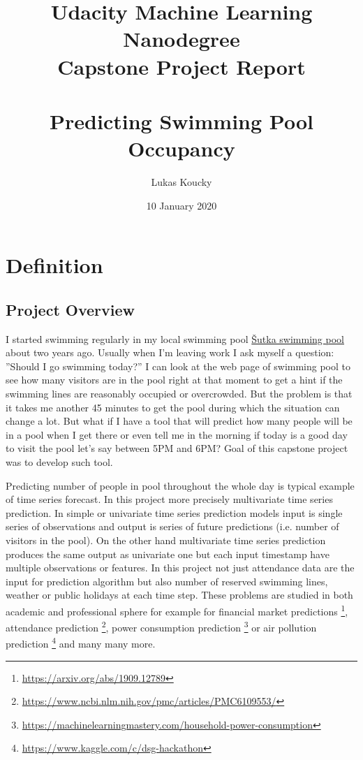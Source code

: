 \documentclass{article}
\title{Udacity Machine Learning Nanodegree\\
       Capstone Project Report \\
        \ \\
        Predicting Swimming Pool Occupancy}
\author{Lukas Koucky}
\date{10 January 2020}
\begin{document}
\maketitle

\section{Definition}
\subsection{Project Overview}
I started swimming regularly in my local swimming pool \href{https://www.sutka.eu/en/}{\v{S}utka swimming pool} about two years ago. Usually when I’m leaving work I ask myself a question: ''Should I go swimming today?'' I can look at the web page of swimming pool to see how many visitors are in the pool right at that moment to get a hint if the swimming lines are reasonably occupied or overcrowded. But the problem is that it takes me another 45 minutes to get the pool during which the situation can change a lot. But what if I have a tool that will predict how many people will be in a pool when I get there or even tell me in the morning if today is a good day to visit the pool let’s say between 5PM and 6PM? Goal of this capstone project was to develop such tool. \par

Predicting number of people in pool throughout the whole day is typical example of time series forecast. In this project more precisely multivariate time series prediction. In simple or univariate time series prediction models input is single series of observations and output is series of future predictions (i.e. number of visitors in the pool). On the other hand multivariate time series prediction produces the same output as univariate one but each input timestamp have multiple observations or features. In this project not just attendance data are the input for prediction algorithm but also number of reserved swimming lines, weather or public holidays at each time step. These problems are studied in both academic and professional sphere for example for financial market predictions \footnote{\url{https://arxiv.org/abs/1909.12789}}, attendance prediction \footnote{\url{https://www.ncbi.nlm.nih.gov/pmc/articles/PMC6109553/}}, power consumption prediction \footnote{\href{https://machinelearningmastery.com/how-to-develop-lstm-models-for-multi-step-time-series-forecasting-of-household-power-consumption/}{https://machinelearningmastery.com/household-power-consumption}} or air pollution prediction \footnote{\url{https://www.kaggle.com/c/dsg-hackathon}} and many many more.\par
\end{document}
